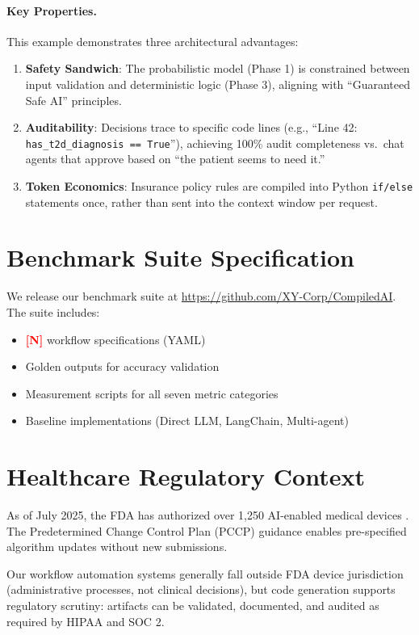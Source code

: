 \documentclass[11pt]{article}
\newcommand{\placeholder}[1]{\textcolor{red}{\textbf{[#1]}}}
\begin{document}
\paragraph{Key Properties.} This example demonstrates three architectural advantages:
\begin{enumerate}
    \item \textbf{Safety Sandwich}: The probabilistic model (Phase 1) is constrained between input validation and deterministic logic (Phase 3), aligning with ``Guaranteed Safe AI'' principles.
    \item \textbf{Auditability}: Decisions trace to specific code lines (e.g., ``Line 42: \texttt{has\_t2d\_diagnosis == True}''), achieving 100\% audit completeness vs.\ chat agents that approve based on ``the patient seems to need it.''
    \item \textbf{Token Economics}: Insurance policy rules are compiled into Python \texttt{if/else} statements once, rather than sent into the context window per request.
\end{enumerate}

\section{Benchmark Suite Specification}
\label{app:benchmark}

We release our benchmark suite at \url{https://github.com/XY-Corp/CompiledAI}. The suite includes:

\begin{itemize}
    \item \placeholder{N} workflow specifications (YAML)
    \item Golden outputs for accuracy validation
    \item Measurement scripts for all seven metric categories
    \item Baseline implementations (Direct LLM, LangChain, Multi-agent)
\end{itemize}

\section{Healthcare Regulatory Context}
\label{app:regulatory}

As of July 2025, the FDA has authorized over 1,250 AI-enabled medical devices \citep{fda2025}. The Predetermined Change Control Plan (PCCP) guidance enables pre-specified algorithm updates without new submissions.

Our workflow automation systems generally fall outside FDA device jurisdiction (administrative processes, not clinical decisions), but code generation supports regulatory scrutiny: artifacts can be validated, documented, and audited as required by HIPAA and SOC 2.
\end{document}
